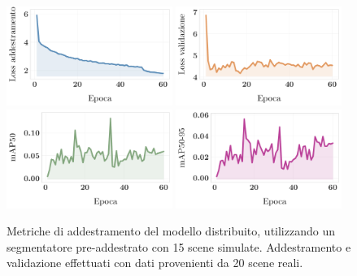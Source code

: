 \documentclass[12pt]{report}
\begin{document}
\begin{figure}[h!]
	\centering
	{\includegraphics[width=0.48\textwidth]{images/fog-robotics/sim-to-real/11/train-loss}}
	\hspace{0.01\textwidth}
	{\includegraphics[width=0.48\textwidth]{images/fog-robotics/sim-to-real/11/validation-loss}}
	\hspace{0.01\textwidth}
	\\
	{\includegraphics[width=0.48\textwidth]{images/fog-robotics/sim-to-real/11/map50}}
	\hspace{0.01\textwidth}
	{\includegraphics[width=0.48\textwidth]{images/fog-robotics/sim-to-real/11/map50-95}}
	\caption{Metriche di addestramento del modello distribuito, utilizzando un segmentatore pre-addestrato con 15 scene simulate. Addestramento e validazione effettuati con dati provenienti da 20 scene reali.}
	\label{fig:training-9}
\end{figure}
\end{document}
